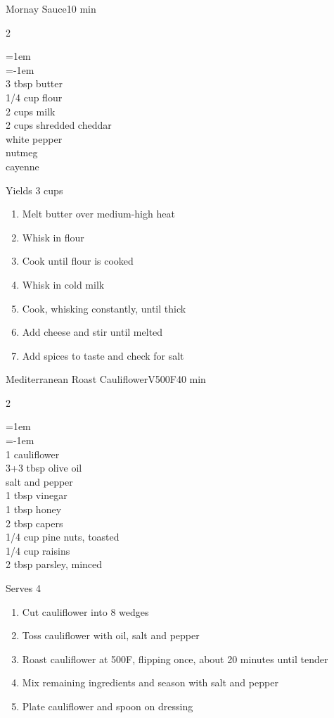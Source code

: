 \documentclass{article}
\newenvironment{recipe}[3][]
    {\begin{cardbase}[#1]{#2}{#3}
    \columnratio{0.333}
    \begin{paracol}{2}}
    {\end{paracol}\end{cardbase}}
\newcommand{\nextcolumn}{\switchcolumn}
\newenvironment{ingredients}
    {
    \begin{obeylines}
    \vspace{\parskip}
    \setlength{\parskip}{0.25em}
    \vspace{-0.25em}
    \leftskip=1em
    \parindent=-1em}
    {\end{obeylines}}
\newenvironment{steps}
    {\begin{enumerate}[leftmargin=*,topsep=0pt]}
    {\end{enumerate}}
\newcommand{\fahrenheit}[1]{#1\textdegree{}F}
\newcommand{\tag}[1]{\hspace{1em}#1}
\newcommand{\symboltag}[2]{\tag{#1\hspace{0.4em}#2}}
\newcommand{\totaltime}[1]{\symboltag{\raisebox{-0.1em}{\small\StopWatchEnd}}{#1}}
\newcommand{\preheat}[1]{\symboltag{\Topbottomheat}{#1}}
\begin{document}
\begin{recipe}{Mornay Sauce}{\totaltime{10 min}}
\begin{ingredients}
3 tbsp butter
1/4 cup flour
2 cups milk
2 cups shredded \hphantom{split} cheddar
white pepper
nutmeg
cayenne
\end{ingredients}
\nextcolumn
Yields 3 cups
\begin{steps}
    \item Melt butter over medium-high heat
    \item Whisk in flour
    \item Cook until flour is cooked
    \item Whisk in cold milk
    \item Cook, whisking constantly, until thick
    \item Add cheese and stir until melted
    \item Add spices to taste and check for salt
\end{steps}
\end{recipe}

\begin{recipe}{Mediterranean Roast Cauliflower}{\tag{V}\preheat{\fahrenheit{500}}\totaltime{40 min}}
\begin{ingredients}
1 cauliflower
3+3 tbsp olive oil
salt and pepper
1 tbsp vinegar
1 tbsp honey
2 tbsp capers
1/4 cup pine nuts, toasted
1/4 cup raisins
2 tbsp parsley, minced
\end{ingredients}
\nextcolumn
Serves 4
\begin{steps}
    \item Cut cauliflower into 8 wedges
    \item Toss cauliflower with oil, salt and pepper
    \item Roast cauliflower at \fahrenheit{500}, flipping once, about 20 minutes until tender
    \item Mix remaining ingredients and season with salt and pepper
    \item Plate cauliflower and spoon on dressing
\end{steps}
\end{recipe}
\end{document}
